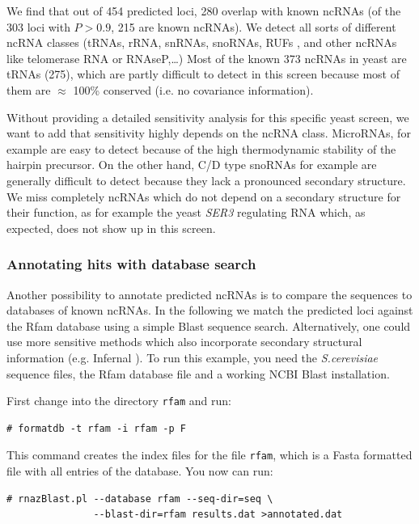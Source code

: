 \documentclass[11pt]{article}
\begin{document}
We find that out of 454 predicted loci, 280 overlap with known ncRNAs (of
the 303 loci with $P>0.9$, 215 are known ncRNAs). We detect all sorts of
different ncRNA classes (tRNAs, rRNA, snRNAs, snoRNAs, RUFs
\cite{mccutcheon03}, and other ncRNAs like telomerase RNA or RNAseP,\dots)
Most of the known 373 ncRNAs in yeast are tRNAs (275), which are partly
difficult to detect in this screen because most of them are $\approx$ 100\%
conserved (i.e. no covariance information).

Without providing a detailed sensitivity analysis for this specific yeast
screen, we want to add that sensitivity highly depends on the ncRNA class.
MicroRNAs, for example are easy to detect because of the high thermodynamic
stability of the hairpin precursor. On the other hand, C/D type snoRNAs for
example are generally difficult to detect because they lack a pronounced
secondary structure. We miss completely ncRNAs which do not depend on a
secondary structure for their function, as for example the yeast
\emph{SER3} regulating RNA \cite{martens04} which, as expected, does not
show up in this screen.


\subsubsection{Annotating hits with database search}
\label{sec:blast}

Another possibility to annotate predicted ncRNAs is to compare the
sequences to databases of known ncRNAs. In the following we match the
predicted loci against the Rfam database \cite{griffiths-jones05} using a
simple Blast sequence search. Alternatively, one could use more sensitive
methods which also incorporate secondary structural information (e.g.
Infernal \cite{eddy02}).  To run this example, you need the
\emph{S.cerevisiae} sequence files, the Rfam database file and a working
NCBI Blast installation.

First change into the directory \texttt{rfam} and run:

\begin{verbatim}
# formatdb -t rfam -i rfam -p F
\end{verbatim}

This command creates the index files for the file \texttt{rfam}, which is a
Fasta formatted file with all entries of the database. You now can run:

\begin{verbatim}
# rnazBlast.pl --database rfam --seq-dir=seq \
               --blast-dir=rfam results.dat >annotated.dat
\end{verbatim}
\end{document}
